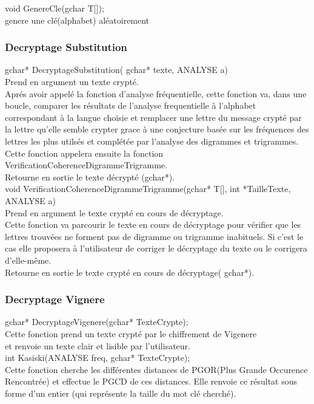 \documentclass[a4]{article}
\begin{document}
	void GenereCle(gchar T[]);\\
		genere une clé(alphabet) aléatoirement
	
	\subsubsection{Decryptage Substitution}
	gchar* DecryptageSubstitution( gchar* texte, ANALYSE a)\\
		Prend en argument un texte crypté.\\
		Aprés avoir appelé la fonction d'analyse fréquentielle, cette fonction va, 
		dans une boucle, comparer les résultats de l'analyse frequentielle à l'alphabet
		 correspondant à la langue choisie et remplacer une lettre du message crypté 
		 par la lettre qu'elle semble crypter grace à une conjecture basée sur les 
		 fréquences des lettres les plus utilsés et complétée par l'analyse des digrammes 
		 et trigrammes. Cette fonction appelera ensuite la fonction VerificationCoherenceDigrammeTrigramme.\\
		Retourne en sortie le texte décrypté (gchar*).\\


	void VerificationCoherenceDigrammeTrigramme(gchar* T[], int *TailleTexte, ANALYSE a)\\
		Prend en argument le texte crypté en cours de décryptage.\\
		Cette fonction va parcourir le texte en cours de décryptage pour vérifier que les lettres trouvées 
		ne forment pas de digramme ou trigramme inabituels. Si c'est le cas elle proposera à l'utilisateur 
		de corriger le décryptage du texte ou le corrigera d'elle-même.\\
		Retourne en sortie le texte crypté en cours de décryptage( gchar*).\\
	
	
	\subsubsection{Decryptage Vignere}
	gchar* DecryptageVigenere(gchar* TexteCrypte);\\
		Cette fonction prend un texte crypté par le chiffrement de Vigenere \\
		et renvoie un texte clair et lisible par l'utilisateur.\\
	
	int Kasiski(ANALYSE freq, gchar* TexteCrypte);\\
		Cette fonction cherche les différentes distances de PGOR(Plus Grande Occurence Rencontrée) et effectue
		le PGCD de ces distances. Elle renvoie ce résultat sous forme d'un entier (qui représente la taille du mot clé cherché).\\
	
\end{document}
